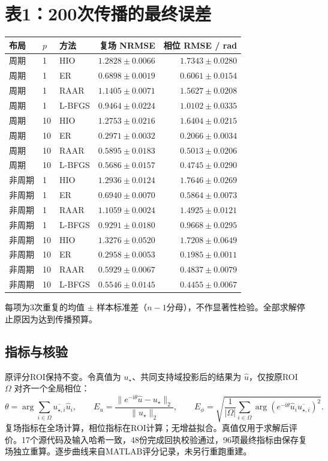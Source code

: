 \documentclass[UTF8,a4paper,11pt,fontset=fandol]{ctexart}
\begin{document}
\section*{表1：200次传播的最终误差}
\small\begin{center}\begin{tabular}{ll l rr}\toprule
布局 & $p$ & 方法 & 复场 NRMSE & 相位 RMSE / rad\\\midrule
周期 & 1 & HIO & $1.2828\pm0.0066$ & $1.7343\pm0.0280$\\
周期 & 1 & ER & $0.6898\pm0.0019$ & $0.6061\pm0.0154$\\
周期 & 1 & RAAR & $1.1405\pm0.0071$ & $1.5627\pm0.0208$\\
周期 & 1 & L-BFGS & $0.9464\pm0.0224$ & $1.0102\pm0.0335$\\
周期 & 10 & HIO & $1.2753\pm0.0216$ & $1.6404\pm0.0215$\\
周期 & 10 & ER & $0.2971\pm0.0032$ & $0.2066\pm0.0034$\\
周期 & 10 & RAAR & $0.5895\pm0.0183$ & $0.5013\pm0.0206$\\
周期 & 10 & L-BFGS & $0.5686\pm0.0157$ & $0.4745\pm0.0290$\\
非周期 & 1 & HIO & $1.2936\pm0.0124$ & $1.7646\pm0.0269$\\
非周期 & 1 & ER & $0.6940\pm0.0070$ & $0.5864\pm0.0073$\\
非周期 & 1 & RAAR & $1.1059\pm0.0024$ & $1.4925\pm0.0121$\\
非周期 & 1 & L-BFGS & $0.9291\pm0.0180$ & $0.9668\pm0.0295$\\
非周期 & 10 & HIO & $1.3276\pm0.0520$ & $1.7208\pm0.0649$\\
非周期 & 10 & ER & $0.2958\pm0.0053$ & $0.1985\pm0.0011$\\
非周期 & 10 & RAAR & $0.5929\pm0.0067$ & $0.4837\pm0.0079$\\
非周期 & 10 & L-BFGS & $0.5546\pm0.0145$ & $0.4455\pm0.0067$\\
\bottomrule\end{tabular}\end{center}
每项为3次重复的均值 $\pm$ 样本标准差（$n-1$分母），不作显著性检验。全部求解停止原因为达到传播预算。
\subsection*{指标与核验}
原评分ROI保持不变。令真值为 $u_\star$、共同支持域投影后的结果为 $\hat u$，仅按原ROI $\Omega$ 对齐一个全局相位：
\[
\theta=\arg\sum_{i\in\Omega}\overline{u_{\star,i}}\hat u_i,\qquad
E_u=\frac{\|e^{-\mathrm{i}\theta}\hat u-u_\star\|_2}{\|u_\star\|_2},\qquad
E_\phi=\sqrt{\frac{1}{|\Omega|}\sum_{i\in\Omega}\arg\!\left(e^{-\mathrm{i}\theta}\hat u_i\overline{u_{\star,i}}\right)^2}.
\]
复场指标在全场计算，相位指标在ROI计算；无增益拟合。真值仅用于求解后评价。17个源代码及输入哈希一致，48份完成回执校验通过，96项最终指标由保存复场独立重算。逐步曲线来自MATLAB评分记录，未另行重跑重建。
\end{document}
